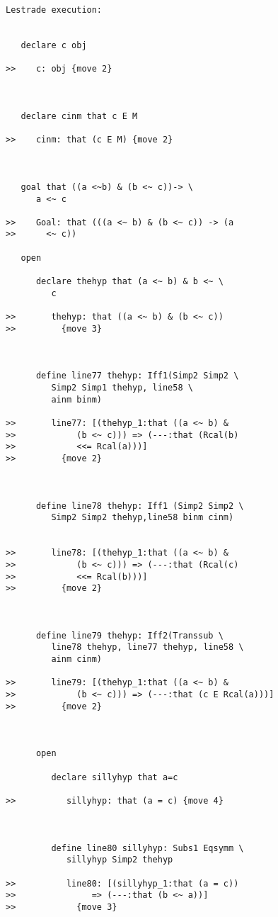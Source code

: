 \documentclass[12pt]{article}
\begin{document}
\begin{verbatim}Lestrade execution:


   declare c obj

>>    c: obj {move 2}



   declare cinm that c E M

>>    cinm: that (c E M) {move 2}



   goal that ((a <~b) & (b <~ c))-> \
      a <~ c

>>    Goal: that (((a <~ b) & (b <~ c)) -> (a
>>      <~ c))

   open

      declare thehyp that (a <~ b) & b <~ \
         c

>>       thehyp: that ((a <~ b) & (b <~ c))
>>         {move 3}



      define line77 thehyp: Iff1(Simp2 Simp2 \
         Simp2 Simp1 thehyp, line58 \
         ainm binm)

>>       line77: [(thehyp_1:that ((a <~ b) &
>>            (b <~ c))) => (---:that (Rcal(b)
>>            <<= Rcal(a)))]
>>         {move 2}



      define line78 thehyp: Iff1 (Simp2 Simp2 \
         Simp2 Simp2 thehyp,line58 binm cinm)


>>       line78: [(thehyp_1:that ((a <~ b) &
>>            (b <~ c))) => (---:that (Rcal(c)
>>            <<= Rcal(b)))]
>>         {move 2}



      define line79 thehyp: Iff2(Transsub \
         line78 thehyp, line77 thehyp, line58 \
         ainm cinm)

>>       line79: [(thehyp_1:that ((a <~ b) &
>>            (b <~ c))) => (---:that (c E Rcal(a)))]
>>         {move 2}



      open

         declare sillyhyp that a=c

>>          sillyhyp: that (a = c) {move 4}



         define line80 sillyhyp: Subs1 Eqsymm \
            sillyhyp Simp2 thehyp

>>          line80: [(sillyhyp_1:that (a = c))
>>               => (---:that (b <~ a))]
>>            {move 3}




\end{verbatim}
\end{document}
